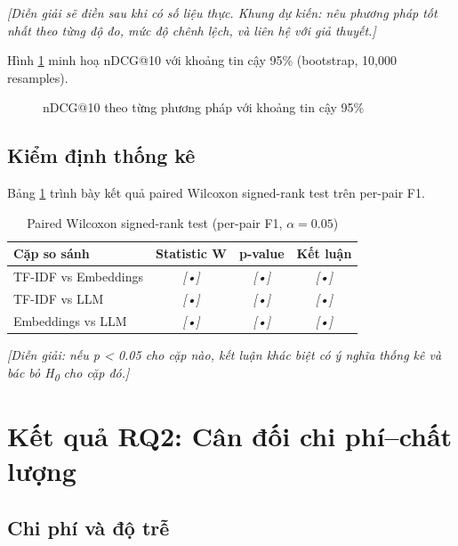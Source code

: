\documentclass[../DoAn.tex]{subfiles}
\begin{document}
\textit{[Diễn giải sẽ điền sau khi có số liệu thực. Khung dự kiến: nêu phương pháp tốt nhất theo từng độ đo, mức độ chênh lệch, và liên hệ với giả thuyết.]}

Hình \ref{fig:rq1_bar} minh hoạ nDCG@10 với khoảng tin cậy 95\% (bootstrap, 10,000 resamples).

\begin{figure}[H]
\centering
{}
\caption{nDCG@10 theo từng phương pháp với khoảng tin cậy 95\%}
\label{fig:rq1_bar}
\end{figure}

\subsection{Kiểm định thống kê}

Bảng \ref{tab:wilcoxon} trình bày kết quả paired Wilcoxon signed-rank test trên per-pair F1.

\begin{table}[H]
\centering
\caption{Paired Wilcoxon signed-rank test (per-pair F1, $\alpha = 0.05$)}
\label{tab:wilcoxon}
\begin{tabular}{|l|c|c|c|}
\hline
\textbf{Cặp so sánh} & \textbf{Statistic W} & \textbf{p-value} & \textbf{Kết luận} \\ \hline
TF-IDF vs Embeddings & \textit{[•]} & \textit{[•]} & \textit{[•]} \\ \hline
TF-IDF vs LLM        & \textit{[•]} & \textit{[•]} & \textit{[•]} \\ \hline
Embeddings vs LLM    & \textit{[•]} & \textit{[•]} & \textit{[•]} \\ \hline
\end{tabular}
\end{table}

\textit{[Diễn giải: nếu p < 0.05 cho cặp nào, kết luận khác biệt có ý nghĩa thống kê và bác bỏ H\textsubscript{0} cho cặp đó.]}

\section{Kết quả RQ2: Cân đối chi phí--chất lượng}
\label{sec:rq2}

\subsection{Chi phí và độ trễ}
\end{document}
